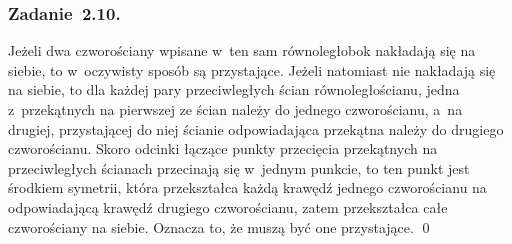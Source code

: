\subsubsection*{Zadanie~2.10.}
Jeżeli dwa czworościany wpisane w~ten sam równoległobok nakładają się na siebie, to w~oczywisty sposób są przystające. Jeżeli natomiast nie nakładają się na siebie, to dla każdej pary przeciwległych ścian równoległościanu, jedna z~przekątnych na pierwszej ze ścian należy do jednego czworościanu, a~na drugiej, przystającej do niej ścianie odpowiadająca przekątna należy do drugiego czworościanu. Skoro odcinki łączące punkty przecięcia przekątnych na przeciwległych ścianach przecinają się w~jednym punkcie, to ten punkt jest środkiem symetrii, która przekształca każdą krawędź jednego czworościanu na odpowiadającą krawędź drugiego czworościanu, zatem przekształca całe czworościany na siebie. Oznacza to, że muszą być one przystające.
\qed
